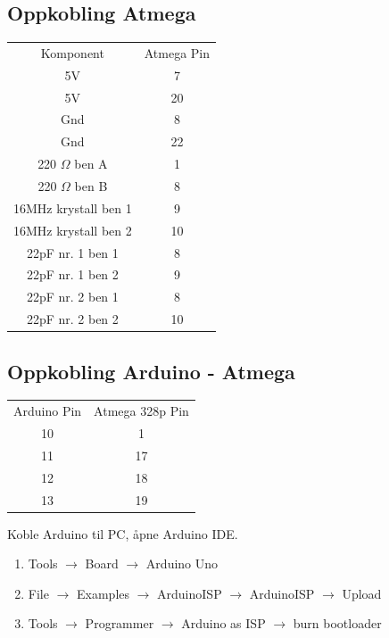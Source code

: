 \documentclass{article}
\begin{document}
\subsection*{Oppkobling Atmega}
\begin{center}
    \begin{longtable}{||c|c||}
    \cline{1-2}
    Komponent & Atmega Pin\\
    \cline{1-2}
    \cline{1-2}
    5V & 7\\
    \cline{1-2}
    5V & 20\\
    \cline{1-2}
    Gnd & 8\\
    \cline{1-2}
    Gnd & 22\\  
    \cline{1-2}
    220 $\Omega$ ben A & 1\\
    \cline{1-2}
    220 $\Omega$ ben B & 8\\
    \cline{1-2}
    16MHz krystall ben 1 & 9\\
    \cline{1-2}
    16MHz krystall ben 2 & 10\\
    \cline{1-2}
    22pF nr. 1 ben 1 & 8\\
    \cline{1-2}
    22pF nr. 1 ben 2 & 9\\
    \cline{1-2}
    22pF nr. 2 ben 1 & 8\\
    \cline{1-2}
    22pF nr. 2 ben 2 & 10\\
    \cline{1-2}
    \end{longtable}
\end{center}
\subsection*{Oppkobling Arduino - Atmega}
\begin{center}
    \begin{longtable}{||c|c||}
    \cline{1-2}
    Arduino Pin & Atmega 328p Pin\\
    \cline{1-2}
    \cline{1-2}
    10 & 1\\
    \cline{1-2}
    11 & 17\\
    \cline{1-2}
    12 & 18\\
    \cline{1-2}
    13 & 19\\
    \cline{1-2}
    \end{longtable}
\end{center}

Koble Arduino til PC, åpne Arduino IDE.
\begin{enumerate}
    \item  Tools $\rightarrow$ Board $\rightarrow$ Arduino Uno
    
    \item File $\rightarrow$ Examples $\rightarrow$ ArduinoISP $\rightarrow$ ArduinoISP $\rightarrow$ Upload
    
    \item Tools $\rightarrow$ Programmer $\rightarrow$ Arduino as ISP $\rightarrow$ burn bootloader
\end{enumerate}
\end{document}
